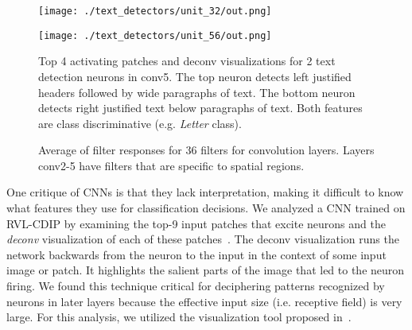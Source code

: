 \documentclass[10pt, conference, compsocconf]{IEEEtran}
\newcommand{\squeezeup}{\vspace{-2.5mm}}
\begin{document}
\begin{figure}
\centering
\texttt{[image: ./text\_detectors/unit\_32/out.png]}
\vspace{4pt}

\texttt{[image: ./text\_detectors/unit\_56/out.png]}

\caption{Top 4 activating patches and deconv visualizations for 2 text detection neurons in conv5.  The top neuron detects left justified headers followed by wide paragraphs of text.  The bottom neuron detects right justified text below paragraphs of text.  Both features are class discriminative (e.g. \emph{Letter} class).}
\label{fig:text_detectors}
\squeezeup
\squeezeup
\end{figure}

\begin{figure}

\centering
{} \hspace{5pt}
 \hspace{5pt}

 \hspace{5pt}

\caption{Average of filter responses for 36 filters for convolution layers.  Layers conv2-5 have filters that are specific to spatial regions.}
\label{fig:spatial}
\squeezeup
\end{figure}



One critique of CNNs is that they lack interpretation, making it difficult to know what features they use for classification decisions.
We analyzed a CNN trained on RVL-CDIP by examining the top-9 input patches that excite neurons and the \emph{deconv} visualization of each of these patches~\cite{zeiler14}.
The deconv visualization runs the network backwards from the neuron to the input in the context of some input image or patch.
It highlights the salient parts of the image that led to the neuron firing.
We found this technique critical for deciphering patterns recognized by neurons in later layers because the effective input size (i.e. receptive field) is very large.
For this analysis, we utilized the visualization tool proposed in~\cite{yosinski15}.
\end{document}
